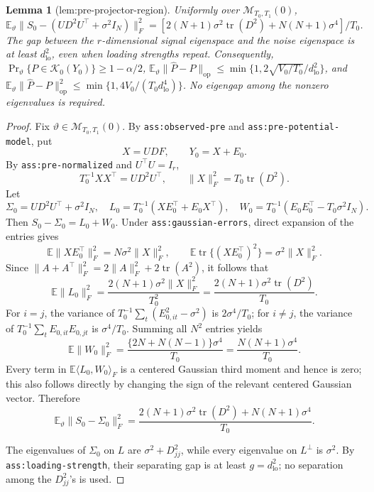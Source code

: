 \documentclass{article}
\newtheorem{lemma}{Lemma}
\begin{document}
\begin{lemma}[lem:pre-projector-region]\label{lem:pre-projector-region}
Uniformly over \(\mathcal M_{T_0,T_1}(0)\), \(\mathbb E_\vartheta\|S_0-(UD^2U^{\top}+\sigma^2I_N)\|_F^2=[2(N+1)\sigma^2\operatorname{tr}(D^2)+N(N+1)\sigma^4]/T_0\). The gap between the \(r\)-dimensional signal eigenspace and the noise eigenspace is at least \(d_{\mathrm{lo}}^2\), even when loading strengths repeat. Consequently, \(\Pr_\vartheta\{P\in\mathcal K_0(Y_0)\}\ge1-\alpha/2\), \(\mathbb E_\vartheta\|\widehat P-P\|_{\mathrm{op}}\le\min\{1,2\sqrt{V_0/T_0}/d_{\mathrm{lo}}^2\}\), and \(\mathbb E_\vartheta\|\widehat P-P\|_{\mathrm{op}}^2\le\min\{1,4V_0/(T_0d_{\mathrm{lo}}^4)\}\). No eigengap among the nonzero eigenvalues is required.
\end{lemma}
\begin{proof}
Fix \(\vartheta\in\mathcal M_{T_0,T_1}(0)\).  By \texttt{ass:observed-pre} and \texttt{ass:pre-potential-model}, put
\[
 X=UDF,
 \qquad
 Y_0=X+E_0.
\]
By \texttt{ass:pre-normalized} and \(U^{\top}U=I_r\),
\[
 T_0^{-1}XX^{\top}=UD^2U^{\top},
 \qquad
 \lVert X\rVert_F^2=T_0\operatorname{tr}(D^2).
\]
Let
\[
 \Sigma_0=UD^2U^{\top}+\sigma^2I_N,
 \quad
 L_0=T_0^{-1}(XE_0^{\top}+E_0X^{\top}),
 \quad
 W_0=T_0^{-1}(E_0E_0^{\top}-T_0\sigma^2I_N).
\]
Then \(S_0-\Sigma_0=L_0+W_0\).  Under \texttt{ass:gaussian-errors}, direct expansion of the entries gives
\[
 \mathbb E\lVert XE_0^{\top}\rVert_F^2
   =N\sigma^2\lVert X\rVert_F^2,
 \qquad
 \mathbb E\operatorname{tr}\{(XE_0^{\top})^2\}
   =\sigma^2\lVert X\rVert_F^2.
\]
Since \(\lVert A+A^{\top}\rVert_F^2=2\lVert A\rVert_F^2+2\operatorname{tr}(A^2)\), it follows that
\[
 \mathbb E\lVert L_0\rVert_F^2
 =\frac{2(N+1)\sigma^2\lVert X\rVert_F^2}{T_0^2}
 =\frac{2(N+1)\sigma^2\operatorname{tr}(D^2)}{T_0}.
\]
For \(i=j\), the variance of \(T_0^{-1}\sum_t(E_{0,it}^2-\sigma^2)\) is \(2\sigma^4/T_0\); for \(i\ne j\), the variance of \(T_0^{-1}\sum_tE_{0,it}E_{0,jt}\) is \(\sigma^4/T_0\).  Summing all \(N^2\) entries yields
\[
 \mathbb E\lVert W_0\rVert_F^2
 =\frac{\{2N+N(N-1)\}\sigma^4}{T_0}
 =\frac{N(N+1)\sigma^4}{T_0}.
\]
Every term in \(\mathbb E\langle L_0,W_0\rangle_F\) is a centered Gaussian third moment and hence is zero; this also follows directly by changing the sign of the relevant centered Gaussian vector.  Therefore
\[
 \mathbb E_\vartheta\lVert S_0-\Sigma_0\rVert_F^2
 =\frac{2(N+1)\sigma^2\operatorname{tr}(D^2)+N(N+1)\sigma^4}{T_0}.
\]

The eigenvalues of \(\Sigma_0\) on \(L\) are \(\sigma^2+D_{jj}^2\), while every eigenvalue on \(L^{\perp}\) is \(\sigma^2\).  By \texttt{ass:loading-strength}, their separating gap is at least \(g=d_{\mathrm{lo}}^2\); no separation among the \(D_{jj}^2\)'s is used.


\end{proof}
\end{document}
